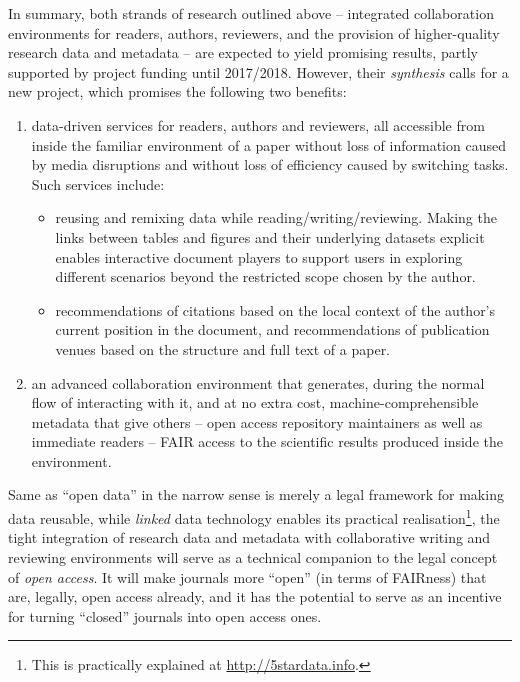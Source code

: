 \documentclass[a4paper,USenglish]{dagrep}
\begin{document}
In summary, both strands of research outlined above – integrated collaboration
environments for readers, authors, reviewers, and the provision of
higher-quality research data and metadata – are expected to yield promising
results, partly supported by project funding until 2017/2018.
However, their \emph{synthesis} calls for a new project, which promises the
following two benefits:
\begin{enumerate}
\item data-driven services for readers, authors and reviewers, all accessible
from inside the familiar environment of a paper without loss of information
caused by media disruptions and without loss of efficiency caused by switching
tasks.
  Such services include:
  \begin{itemize}
  \item reusing and remixing data while reading/writing/reviewing.
    Making the links between tables and figures and their underlying datasets
explicit enables interactive document players to support users in exploring
different scenarios beyond the restricted scope chosen by the author.
  \item recommendations of citations based on the local context of the author's
current position in the document, and recommendations of publication venues
based on the structure and full text of a paper.
  \end{itemize}
\item an advanced collaboration environment that generates, during the normal
flow of interacting with it, and at no extra cost, machine-comprehensible
metadata that give others
– open access repository maintainers as well as immediate readers – FAIR access
to the scientific results produced inside the environment.
\end{enumerate}

Same as ``open data'' in the narrow sense is merely a legal framework for making
data reusable, while \emph{linked} data technology enables its practical
realisation\footnote{This is practically explained at
\url{http://5stardata.info}.}, the tight integration of research data and
metadata with collaborative writing and reviewing environments will serve as a
technical companion to the legal concept of \emph{open access}.
It will make journals more ``open'' (in terms of FAIRness) that are, legally,
open access already, and it has the potential to serve as an incentive for
turning ``closed'' journals into open access ones.
\end{document}
